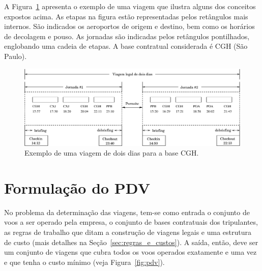 A Figura~\ref{fig:viagem} apresenta o exemplo de uma viagem que ilustra alguns dos conceitos
expostos acima. As etapas na figura estão representadas pelos retângulos mais internos. São
indicados os aeroportos de origem e destino, bem como os horários de decolagem e pouso. As
jornadas são indicadas pelos retângulos pontilhados, englobando uma cadeia de etapas. A base 
contratual considerada é CGH (São Paulo). 

\begin{figure}[htbp]
	\begin{center}
		\includegraphics[scale=0.5]{fig/viagem.eps}
		\caption{Exemplo de uma viagem de dois dias para a base CGH.}
		\label{fig:viagem}
	\end{center}
\end{figure}


\section{Formulação do PDV}
\label{sec:formulacao}

No problema da determinação das viagens, tem-se como entrada o conjunto de voos a ser operado pela
empresa, o conjunto de bases contratuais dos tripulantes, as regras de trabalho que ditam a
construção de viagens legais e uma estrutura de custo (mais detalhes na 
Seção~\ref{sec:regras_e_custos}). A saída, então, deve ser um conjunto de viagens que cubra todos os
voos operados exatamente e uma vez e que tenha o custo mínimo (veja Figura~\ref{fig:pdv}).

